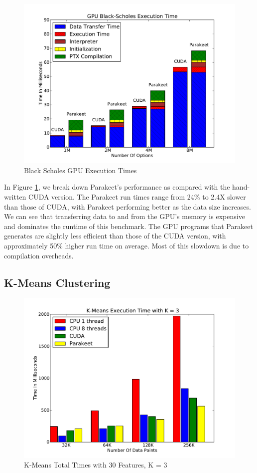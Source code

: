 \documentclass[10pt,twocolumn]{article}
\begin{document}
\begin{figure}
\includegraphics[scale=0.4]{BSNOCPU.pdf}
\caption{Black Scholes GPU Execution Times}
\label{BSGPU}
\end{figure}

In Figure \ref{BSGPU}, we break down Parakeet's performance as compared with the hand-written CUDA version.  The Parakeet run times range from 24\% to 2.4X slower than those of CUDA, with Parakeet performing better as the data size increases.  We can see that transferring data to and from the GPU's memory is expensive and dominates the runtime of this benchmark.  The GPU programs that Parakeet generates are slightly less efficient than those of the CUDA version, with approximately 50\% higher run time on average.  Most of this slowdown is due to compilation overheads.

\subsection{K-Means Clustering}
\label{results-k-means}

\begin{figure}[h!]
\includegraphics[scale=0.4]{KMCPUK3.pdf}
\caption{K-Means Total Times with 30 Features, K = 3}
\label{KMCPU3}
\end{figure}
\end{document}
